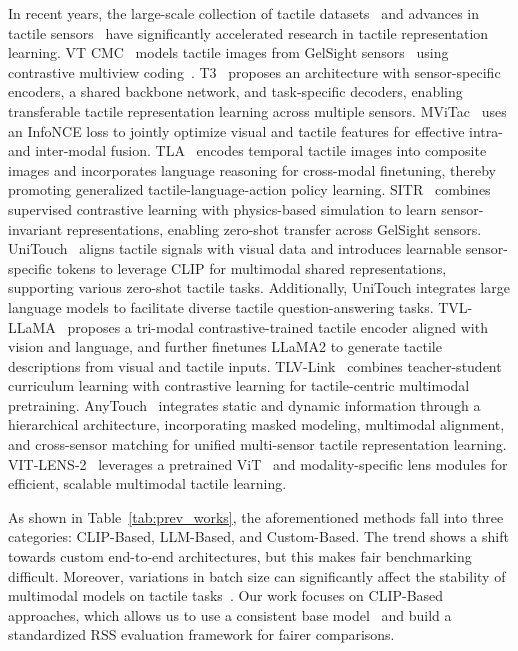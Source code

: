\documentclass[letterpaper]{article} %
\theoremstyle{definition}                %
\theoremstyle{plain}                     %
\theoremstyle{remark}                    %
\begin{document}
In recent years, the large-scale collection of tactile datasets~\cite{yang2022touch, kerr2022self, fu2024tou, yu2024octopi, cheng2025touch100k, feng2025anytouch} and advances in tactile sensors~\cite{yuan2017gelsight, lambeta2020digit, zhang2024compact} have significantly accelerated research in tactile representation learning. VT CMC~\cite{yang2022touch} models tactile images from GelSight sensors~\cite{yuan2017gelsight} using contrastive multiview coding~\cite{tian2020contrastive}. T3~\cite{zhao2024transferable} proposes an architecture with sensor-specific encoders, a shared backbone network, and task-specific decoders, enabling transferable tactile representation learning across multiple sensors. MViTac~\cite{dave2024multimodal} uses an InfoNCE loss to jointly optimize visual and tactile features for effective intra- and inter-modal fusion. TLA~\cite{hao2025tla} encodes temporal tactile images into composite images and incorporates language reasoning for cross-modal finetuning, thereby promoting generalized tactile-language-action policy learning. SITR~\cite{gupta2025sensor} combines supervised contrastive learning with physics-based simulation to learn sensor-invariant representations, enabling zero-shot transfer across GelSight sensors. UniTouch~\cite{yang2024binding} aligns tactile signals with visual data and introduces learnable sensor-specific tokens to leverage CLIP for multimodal shared representations, supporting various zero-shot tactile tasks. Additionally, UniTouch integrates large language models to facilitate diverse tactile question-answering tasks. TVL-LLaMA~\cite{fu2024tou} proposes a tri-modal contrastive-trained tactile encoder aligned with vision and language, and further finetunes LLaMA2 to generate tactile descriptions from visual and tactile inputs. TLV-Link~\cite{cheng2025touch100k} combines teacher-student curriculum learning with contrastive learning for tactile-centric multimodal pretraining. AnyTouch~\cite{feng2025anytouch} integrates static and dynamic information through a hierarchical architecture, incorporating masked modeling, multimodal alignment, and cross-sensor matching for unified multi-sensor tactile representation learning. VIT-LENS-2~\cite{lei2024vit} leverages a pretrained ViT~\cite{dosovitskiy2020image} and modality-specific lens modules for efficient, scalable multimodal tactile learning.



As shown in Table~\ref{tab:prev_works}, the aforementioned methods fall into three categories: CLIP-Based, LLM-Based, and Custom-Based. The trend shows a shift towards custom end-to-end architectures, but this makes fair benchmarking difficult. Moreover, variations in batch size can significantly affect the stability of multimodal models on tactile tasks~\cite{higuera2024sparsh}. Our work focuses on CLIP-Based approaches, which allows us to use a consistent base model~\cite{cherti2023reproducible} and build a standardized RSS evaluation framework for fairer comparisons.
\end{document}

